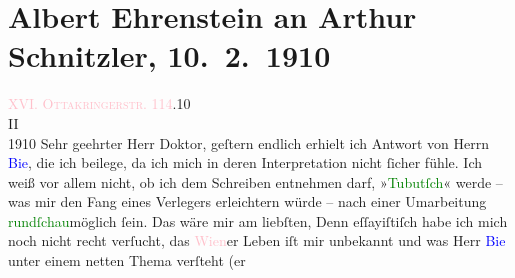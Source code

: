 

               \section[Albert Ehrenstein an Arthur Schnitzler, 10. 2. 1910]{ Albert Ehrenstein an Arthur Schnitzler, 10. 2. 1910}\nopagebreak{}\rehead{ }\normalsize\beginnumbering{} \toendnotes[C]{\smallbreak\pagebreak[2]} 
\toendnotes[C]{\smallbreak}\pstart
           {\pb}\textcolor{pink}{XVI. \textsc{Ottakringerstr.} 114}{}\ledrightnote{\textcolor{pink}{Ottakringerstraße}}.\hfill 10{\\}II{\\}1910\pend
           \pstart{}Sehr geehrter Herr Doktor,\pend\pstart
           geſtern endlich erhielt ich Antwort von Herrn \textcolor{blue}{Bie}{}\ledrightnote{\textcolor{blue}{Oskar Bie}}, die ich beilege, da ich mich in deren Interpretation nicht ſicher
                    fühle. Ich weiß vor allem nicht, ob ich dem Schreiben entnehmen darf, »\textcolor{green}{Tubutſch}{}\ledrightnote{\textcolor{green}{Tubutsch}}« werde – was mir den Fang eines
                    Verlegers erleichtern würde – nach einer Umarbeitung \textcolor{green}{rundſchau}{}\ledrightnote{\textcolor{green}{Die neue Rundschau}}möglich ſein. Das wäre mir am liebſten, Denn
                    eſſayiſtiſch habe ich mich noch nicht recht verſucht, das \textcolor{pink}{Wien}{}\ledrightnote{\textcolor{pink}{Wien}}er Leben iſt mir unbekannt und was Herr \textcolor{blue}{Bie}{}\ledrightnote{\textcolor{blue}{Oskar Bie}} unter einem netten Thema verſteht (er

